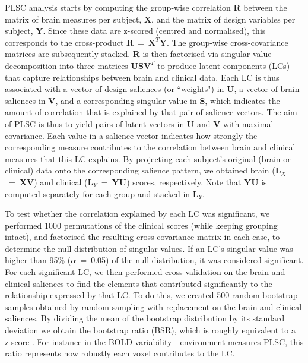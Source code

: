 PLSC analysis starts by computing the group-wise correlation \textbf{R} between the matrix of brain measures per subject, \textbf{X}, and the matrix of design variables per subject, \textbf{Y}. Since these data are z-scored (centred and normalised), this corresponds to the cross-product \textbf{R}~=~$\textbf{X}^{T}\textbf{Y}$. The group-wise cross-covariance matrices are subsequently stacked. \textbf{R} is then factorised via singular value decomposition into three matrices \textbf{U}\textbf{S}$\textbf{V}^{T}$ to produce latent components (LCs) that capture relationships between brain and clinical data. Each LC is thus associated with a vector of design saliences (or ``weights") in \textbf{U}, a vector of brain saliences in \textbf{V}, and a corresponding singular value in \textbf{S}, which indicates the amount of correlation that is explained by that pair of salience vectors. The aim of PLSC is thus to yield pairs of latent vectors in \textbf{U} and \textbf{V} with maximal covariance. Each value in a salience vector indicates how strongly the corresponding measure contributes to the correlation between brain and clinical measures that this LC explains. By projecting each subject's original (brain or clinical) data onto the corresponding salience pattern, we obtained brain ($\textbf{L}_X$~=~\textbf{XV}) and clinical ($\textbf{L}_Y$~=~\textbf{YU}) scores, respectively. Note that \textbf{YU} is computed separately for each group and stacked in $\textbf{L}_Y$. 

To test whether the correlation explained by each LC was significant, we performed 1000 permutations of the clinical scores (while keeping grouping intact), and factorised the resulting cross-covariance matrix in each case, to determine the null distribution of singular values. If an LC's singular value was higher than 95\% ($\alpha$~=~0.05) of the null distribution, it was considered significant. For each significant LC, we then performed cross-validation on the brain and clinical saliences to find the elements that contributed significantly to the relationship expressed by that LC. To do this, we created 500 random bootstrap samples obtained by random sampling with replacement on the brain and clinical saliences. By dividing the mean of the bootstrap distribution by its standard deviation we obtain the bootstrap ratio (BSR), which is roughly equivalent to a z-score \citep{McIntosh2004, Krishnan2011}.  For instance in the BOLD variability - environment measures PLSC,  this ratio represents how robustly each voxel contributes to the LC.

